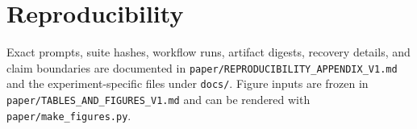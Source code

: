 \documentclass[11pt]{article}
\begin{document}
\section*{Reproducibility}
Exact prompts, suite hashes, workflow runs, artifact digests, recovery details, and claim boundaries are documented in \texttt{paper/REPRODUCIBILITY\_APPENDIX\_V1.md} and the experiment-specific files under \texttt{docs/}. Figure inputs are frozen in \texttt{paper/TABLES\_AND\_FIGURES\_V1.md} and can be rendered with \texttt{paper/make\_figures.py}.



\end{document}
